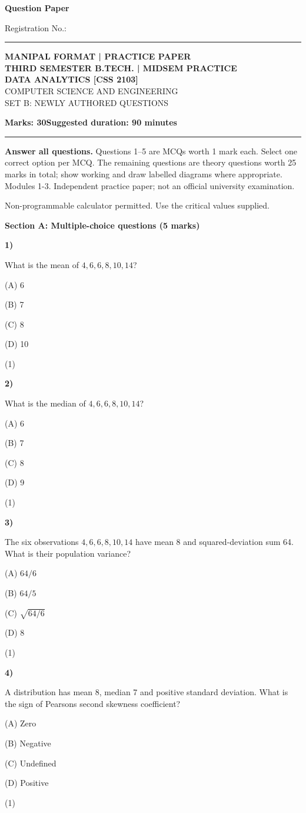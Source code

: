 \documentclass[11pt,a4paper]{article}
\newcommand{\question}[3]{\par\vspace{8pt}\noindent\begin{minipage}[t]{0.075\linewidth}\textbf{#1)}\end{minipage}\begin{minipage}[t]{0.855\linewidth}#3\end{minipage}\hfill\begin{minipage}[t]{0.055\linewidth}\raggedleft(#2)\end{minipage}\par}
\begin{document}
{\LARGE\bfseries Question Paper}\hfill {\small Registration No.: \rule{33mm}{0.3pt}}\par\vspace{8pt}
\begin{center}{\large\bfseries MANIPAL FORMAT | PRACTICE PAPER}\\[6pt]{\bfseries THIRD SEMESTER B.TECH. | MIDSEM PRACTICE}\\[4pt]{\bfseries DATA ANALYTICS [CSS 2103]}\\[4pt]{\small COMPUTER SCIENCE AND ENGINEERING}\\[3pt]{\small SET B: NEWLY AUTHORED QUESTIONS}\end{center}
\textbf{Marks: 30}\hfill\textbf{Suggested duration: 90 minutes}\par\vspace{3pt}\hrule\vspace{5pt}
{\small\textbf{Answer all questions.} Questions 1--5 are MCQs worth 1 mark each. Select one correct option per MCQ. The remaining questions are theory questions worth 25 marks in total; show working and draw labelled diagrams where appropriate. Modules 1-3. Independent practice paper; not an official university examination.}\par
{\small Non-programmable calculator permitted. Use the critical values supplied.}\par
\medskip\textbf{Section A: Multiple-choice questions (5 marks)}\par
\question{1}{1}{What is the mean of $4,6,6,8,10,14$?\par (A) 6\par (B) 7\par (C) 8\par (D) 10}
\question{2}{1}{What is the median of $4,6,6,8,10,14$?\par (A) 6\par (B) 7\par (C) 8\par (D) 9}
\question{3}{1}{The six observations $4,6,6,8,10,14$ have mean 8 and squared-deviation sum 64. What is their population variance?\par (A) $64/6$\par (B) $64/5$\par (C) $\sqrt{64/6}$\par (D) $8$}
\question{4}{1}{A distribution has mean 8, median 7 and positive standard deviation. What is the sign of Pearson\textquotesingle s second skewness coefficient?\par (A) Zero\par (B) Negative\par (C) Undefined\par (D) Positive}
\end{document}
